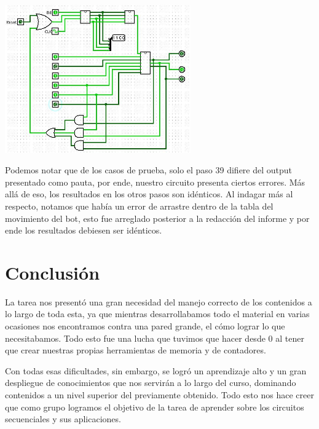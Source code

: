 \documentclass[a4paper]{article}
\begin{document}
\begin{center}
	\includegraphics[width=0.6\textwidth]{tarea-2-prueba-42.jpg}
\end{center}

Podemos notar que de los casos de prueba, solo el paso 39 difiere del output presentado como pauta, por ende, nuestro circuito presenta ciertos errores. Más allá de eso, los resultados en los otros pasos son idénticos. Al indagar más al respecto, notamos que había un error de arrastre dentro de la tabla del movimiento del bot, esto fue arreglado posterior a la redacción del informe y por ende los resultados debiesen ser idénticos.

\newpage

\section{Conclusión}

La tarea nos presentó una gran necesidad del manejo correcto de los contenidos a lo largo de toda esta, ya que mientras desarrollabamos todo el material en varias ocasiones nos encontramos contra una pared grande, el cómo lograr lo que necesitabamos. Todo esto fue una lucha que tuvimos que hacer desde 0 al tener que crear nuestras propias herramientas de memoria y de contadores.

Con todas esas dificultades, sin embargo, se logró un aprendizaje alto y un gran despliegue de conocimientos que nos servirán a lo largo del curso, dominando contenidos a un nivel superior del previamente obtenido. Todo esto nos hace creer que como grupo logramos el objetivo de la tarea de aprender sobre los circuitos secuenciales y sus aplicaciones.

\newpage
\end{document}
